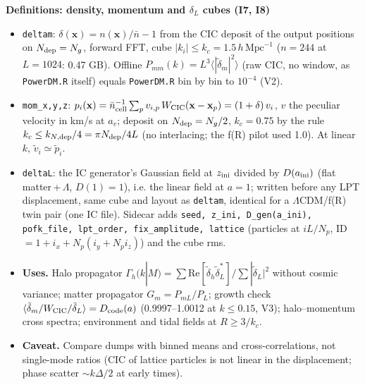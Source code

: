 \documentclass[UTF8]{beamer}
\begin{document}
\begin{frame}{\textbf{Definitions: density, momentum and $\delta_L$ cubes (I7, I8)}}
  \footnotesize
  \begin{itemize}
    \item \texttt{deltam}: $\delta(\mathbf{x}) = n(\mathbf{x})/\bar n - 1$ from the CIC deposit of the output positions on
      $N_{\rm dep} = N_g$, forward FFT, cube $|k_i| \le k_c = 1.5\,h\,\mathrm{Mpc}^{-1}$ ($n = 244$ at $L = 1024$: 0.47 GB).
      Offline $P_{mm}(k) = L^3\langle|\tilde\delta_m|^2\rangle$ (raw CIC, no window, as \texttt{PowerDM.R} itself) equals \texttt{PowerDM.R} bin by bin to $10^{-4}$ (V2).
    \item \texttt{mom\_x,y,z}: $p_i(\mathbf{x}) = \bar n_{\rm cell}^{-1}\sum_p v_{i,p}\,W_{\rm CIC}(\mathbf{x}-\mathbf{x}_p)
      = (1+\delta)\,v_i$, $v$ the peculiar velocity in km/s at $a_v$; deposit on $N_{\rm dep} = N_g/2$, $k_c = 0.75$ by
      the rule $k_c \le k_{N,\rm dep}/4 = \pi N_{\rm dep}/4L$ (no interlacing; the f(R) pilot used 1.0).
      At linear $k$, $\tilde v_i \simeq \tilde p_i$.
    \item \texttt{deltaL}: the IC generator's Gaussian field at $z_{\rm ini}$ divided by $D(a_{\rm ini})$ (flat
      matter\,+\,$\Lambda$, $D(1) = 1$), i.e. the linear field at $a = 1$; written before any LPT displacement, same cube
      and layout as \texttt{deltam}, identical for a $\Lambda$CDM/f(R) twin pair (one IC file). Sidecar adds
      \texttt{seed, z\_ini, D\_gen(a\_ini), pofk\_file, lpt\_order, fix\_amplitude, lattice} (particles at $iL/N_p$,
      ID $= 1 + i_x + N_p(i_y + N_p i_z)$) and the cube rms.
    \item \textbf{Uses.} Halo propagator $\Gamma_h(k|M) = \sum\mathrm{Re}[\tilde\delta_h\tilde\delta_L^*]/\sum|\tilde\delta_L|^2$
      without cosmic variance; matter propagator $G_m = P_{mL}/P_L$; growth check
      $\langle\tilde\delta_m/W_{\rm CIC}/\tilde\delta_L\rangle = D_{\rm code}(a)$ (0.9997--1.0012 at $k \le 0.15$, V3);
      halo--momentum cross spectra; environment and tidal fields at $R \ge 3/k_c$.
    \item \textbf{Caveat.} Compare dumps with binned means and cross-correlations, not single-mode ratios (CIC of lattice
      particles is not linear in the displacement; phase scatter $\sim k\Delta/2$ at early times).
  \end{itemize}
\end{frame}
\end{document}
